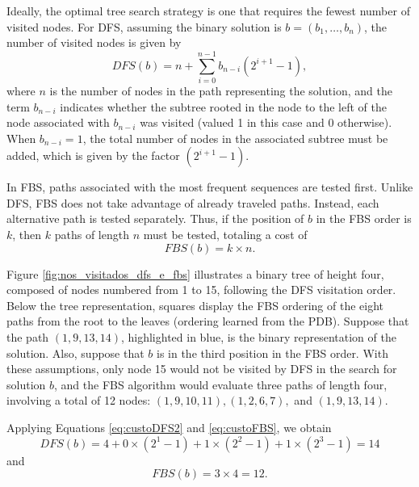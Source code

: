 \documentclass[journal=jacsat,manuscript=article]{achemso}
\begin{document}
Ideally, the optimal tree search strategy is one that requires the fewest number of visited nodes. For DFS, assuming the binary solution is $b=(b_1,\ldots,b_n)$, the number of visited nodes is given by
\begin{equation}\label{eq:custoDFS2}
DFS(b)= n + \sum_{i=0}^{n-1} b_{n-i} (2^{i+1} - 1),
\end{equation}
where $n$ is the number of nodes in the path representing the solution, and the term $b_{n-i}$ indicates whether the subtree rooted in the node to the left of the node associated with $b_{n-i}$ was visited (valued 1 in this case and 0 otherwise). When $b_{n-i}=1$, the total number of nodes in the associated subtree must be added, which is given by the factor $(2^{i+1}-1)$.

In FBS, paths associated with the most frequent sequences are tested first. Unlike DFS, FBS does not take advantage of already traveled paths. Instead, each alternative path is tested separately. Thus, if the position of $b$ in the FBS order is $k$, then $k$ paths of length $n$ must be tested, totaling a cost of
\begin{equation}\label{eq:custoFBS}
    FBS(b)=k \times n.
\end{equation}

Figure \ref{fig:nos_visitados_dfs_e_fbs} illustrates a binary tree of height four, composed of nodes numbered from 1 to 15, following the DFS visitation order. Below the tree representation, squares display the FBS ordering of the eight paths from the root to the leaves (ordering learned from the PDB). Suppose that the path $(1,9,13,14)$, highlighted in blue, is the binary representation of the solution. Also, suppose that $b$ is in the third position in the FBS order. With these assumptions, only node 15 would not be visited by DFS in the search for solution $b$, and the FBS algorithm would evaluate three paths of length four, involving a total of 12 nodes: $(1,9,10,11), (1,2,6,7),$ and $(1,9,13,14)$.

Applying Equations \eqref{eq:custoDFS2} and \eqref{eq:custoFBS}, we obtain
$$DFS(b)=4+0\times (2^{1}-1)+1\times(2^{2}-1)+1\times(2^3-1)=14$$
and 
$$FBS(b)=3\times 4= 12.$$
\end{document}
